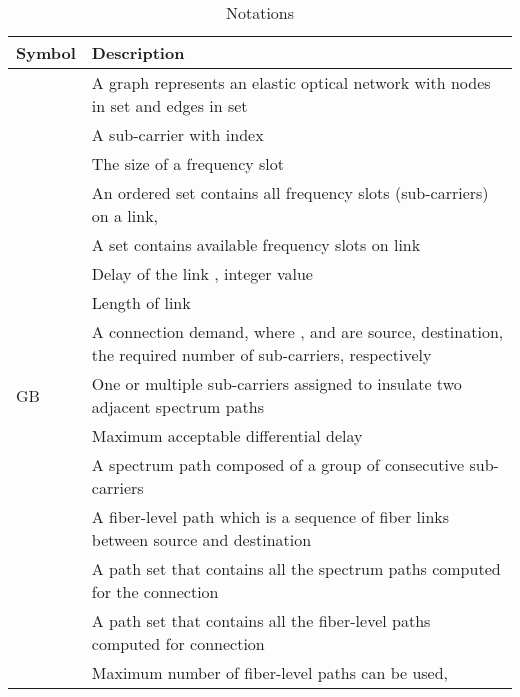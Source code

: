 \documentclass[conference]{IEEEtran}
\begin{document}
  \begin{table} 
\small
\begin{tabular}{|p{}|p{}|} 
\hline
Symbol & Description \\ \hline \hline
\multirow{2}{*}{} & A graph represents an elastic optical network with  nodes in  set  and edges in set  \\
 & A sub-carrier with index  \\
  & The size of a frequency slot\\
 & An ordered set contains all frequency slots (sub-carriers) on a link,  \\
 & A set  contains available frequency slots on link  \\
 & Delay of the link ,  integer value \\
 & Length of link \\
 & A connection demand, where    ,  and  are source, destination, the required number of sub-carriers, respectively  \\
GB &  One or multiple sub-carriers assigned to insulate two adjacent spectrum paths\\
 & Maximum acceptable differential delay  \\
 & A spectrum path composed of a group of consecutive sub-carriers\\
 & A fiber-level path which is a sequence of fiber links between source and destination\\
   & A path set that contains all the spectrum paths computed for the connection  \\ 
   & A path set that contains all the fiber-level paths computed for connection  \\  
     & Maximum number of fiber-level paths can be used,  \\  
     \hline 
\end{tabular}
\caption{Notations}
\label{tab:notation}
\end{table}
        
        
\end{document}
